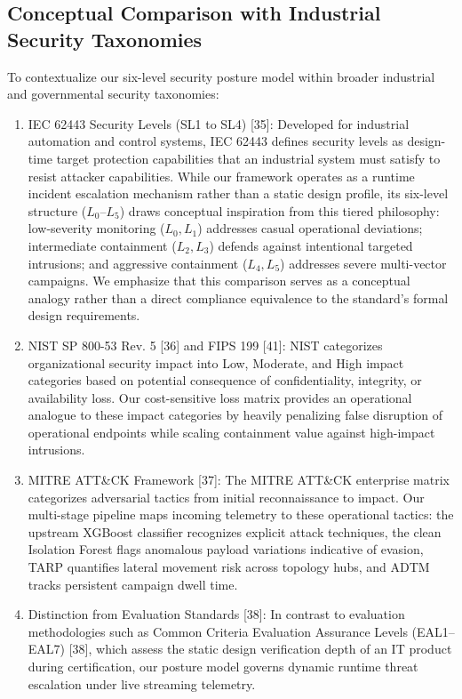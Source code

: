 \documentclass[journal,10pt,onecolumn]{IEEEtran}
\begin{document}
\subsection{Conceptual Comparison with Industrial Security Taxonomies}
To contextualize our six-level security posture model within broader industrial and governmental security taxonomies:
\begin{enumerate}
  \item IEC 62443 Security Levels (SL1 to SL4) [35]: Developed for industrial automation and control systems, IEC 62443 defines security levels as design-time target protection capabilities that an industrial system must satisfy to resist attacker capabilities. While our framework operates as a runtime incident escalation mechanism rather than a static design profile, its six-level structure ($L_0$–$L_5$) draws conceptual inspiration from this tiered philosophy: low-severity monitoring ($L_0, L_1$) addresses casual operational deviations; intermediate containment ($L_2, L_3$) defends against intentional targeted intrusions; and aggressive containment ($L_4, L_5$) addresses severe multi-vector campaigns. We emphasize that this comparison serves as a conceptual analogy rather than a direct compliance equivalence to the standard's formal design requirements.
  \item NIST SP 800-53 Rev. 5 [36] and FIPS 199 [41]: NIST categorizes organizational security impact into Low, Moderate, and High impact categories based on potential consequence of confidentiality, integrity, or availability loss. Our cost-sensitive loss matrix provides an operational analogue to these impact categories by heavily penalizing false disruption of operational endpoints while scaling containment value against high-impact intrusions.
  \item MITRE ATT&CK Framework [37]: The MITRE ATT&CK enterprise matrix categorizes adversarial tactics from initial reconnaissance to impact. Our multi-stage pipeline maps incoming telemetry to these operational tactics: the upstream XGBoost classifier recognizes explicit attack techniques, the clean Isolation Forest flags anomalous payload variations indicative of evasion, TARP quantifies lateral movement risk across topology hubs, and ADTM tracks persistent campaign dwell time.
  \item Distinction from Evaluation Standards [38]: In contrast to evaluation methodologies such as Common Criteria Evaluation Assurance Levels (EAL1–EAL7) [38], which assess the static design verification depth of an IT product during certification, our posture model governs dynamic runtime threat escalation under live streaming telemetry.
\end{enumerate}
\end{document}
